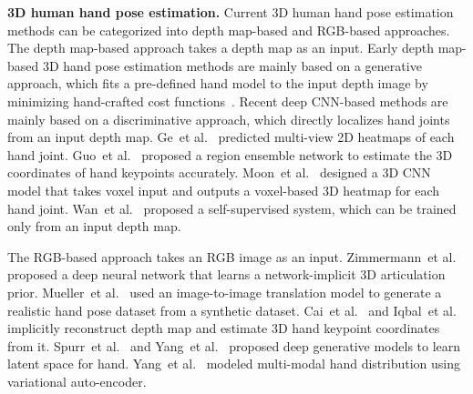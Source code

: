 \documentclass[runningheads]{llncs}
\begin{document}
\noindent \textbf{3D human hand pose estimation.}
Current 3D human hand pose estimation methods can be categorized into depth map-based and RGB-based approaches.
The depth map-based approach takes a depth map as an input.
Early depth map-based 3D hand pose estimation methods are mainly based on a generative approach, which fits a pre-defined hand model to the input depth image by minimizing hand-crafted cost functions~\cite{sharp2015accurate, tang2015opening}. 
Recent deep CNN-based methods are mainly based on a discriminative approach, which directly localizes hand joints from an input depth map.
Ge~et al.~\cite{ge2016robust} predicted multi-view 2D heatmaps of each hand joint.
Guo~et al.~\cite{guo2017ren} proposed a region ensemble network to estimate the 3D coordinates of hand keypoints accurately.
Moon~et al.~\cite{moon2018v2v} designed a 3D CNN model that takes voxel input and outputs a voxel-based 3D heatmap for each hand joint.
Wan~et al.~\cite{wan2019self} proposed a self-supervised system, which can be trained only from an input depth map. 

The RGB-based approach takes an RGB image as an input.
Zimmermann~et al.~\cite{zimmermann2017learning} proposed a deep neural network that learns a network-implicit 3D articulation prior.
Mueller~et al.~\cite{mueller2018ganerated} used an image-to-image translation model to generate a realistic hand pose dataset from a synthetic dataset.
Cai~et al.~\cite{cai2018weakly} and Iqbal~et al.~\cite{iqbal2018hand} implicitly reconstruct depth map and estimate 3D hand keypoint coordinates from it.
Spurr~et al.~\cite{spurr2018cross} and Yang~et al.~\cite{yang2019disentangling} proposed deep generative models to learn latent space for hand.
Yang~et al.~\cite{yang2019aligning} modeled multi-modal hand distribution using variational auto-encoder.
\fi
\end{document}
